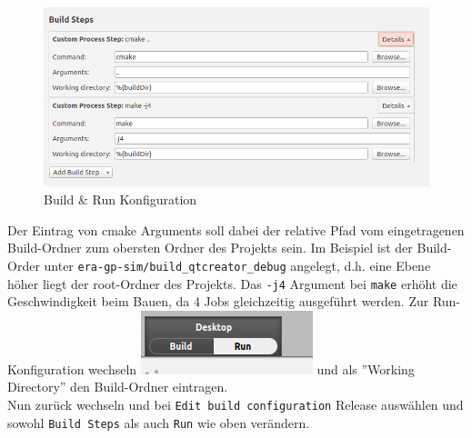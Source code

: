 \begin{figure}[H]
	\centering
	\includegraphics[scale=0.5]{images/setup-qtcreator-buildrun-config.png}
	\caption{Build \& Run Konfiguration}
\end{figure}

Der Eintrag von cmake Arguments soll dabei der relative Pfad vom eingetragenen
Build-Ordner zum obersten Ordner des Projekts sein. Im Beispiel ist der
Build-Order unter \texttt{era-gp-sim/build\_qtcreator\_debug} angelegt, d.h.
eine Ebene höher liegt der root-Ordner des Projekts. Das \texttt{-j4} Argument
bei \texttt{make} erhöht die Geschwindigkeit beim Bauen, da 4 Jobs gleichzeitig
ausgeführt werden. Zur Run-Konfiguration wechseln
\includegraphics[scale=1.0]{images/setup-qtcreator-run-config} und als ''Working
Directory'' den Build-Ordner eintragen.\\

Nun zurück wechseln und bei \texttt{Edit build configuration} Release auswählen und
sowohl \texttt{Build Steps} als auch \texttt{Run} wie oben verändern.\\

